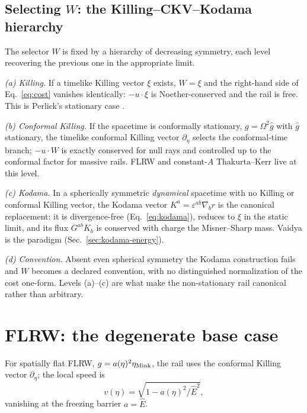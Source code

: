 \documentclass[12pt]{iopart}
\newcommand{\Ehat}{\hat E}
\begin{document}
\subsection{Selecting $W$: the Killing--CKV--Kodama hierarchy}
\label{sec:whierarchy}
The selector $W$ is fixed by a hierarchy of decreasing symmetry, each level
recovering the previous one in the appropriate limit.

\emph{(a) Killing.} If a timelike Killing vector $\xi$ exists, $W=\xi$ and the
right-hand side of Eq.~\eqref{eq:cost} vanishes identically: $-u\cdot\xi$ is
Noether-conserved and the rail is free. This is Perlick's stationary case
\cite{Perlick1991}.

\emph{(b) Conformal Killing.} If the spacetime is conformally stationary,
$g=\Omega^2\hat g$ with $\hat g$ stationary, the timelike conformal Killing
vector $\partial_\eta$ selects the conformal-time branch; $-u\cdot W$ is exactly
conserved for null rays and controlled up to the conformal factor for massive
rails. FLRW and constant-$A$ Thakurta--Kerr live at this level.

\emph{(c) Kodama.} In a spherically symmetric \emph{dynamical} spacetime with no
Killing or conformal Killing vector, the Kodama vector
$K^a=\varepsilon^{ab}\nabla_b r$ \cite{Kodama1980,Hayward1996} is the canonical
replacement: it is divergence-free (Eq.~\eqref{eq:kodama}), reduces to $\xi$ in
the static limit, and its flux $G^{ab}K_b$ is conserved with charge the
Misner--Sharp mass. Vaidya is the paradigm (Sec.~\ref{sec:kodama-energy}).

\emph{(d) Convention.} Absent even spherical symmetry the Kodama construction
fails and $W$ becomes a declared convention, with no distinguished normalization
of the cost one-form. Levels (a)--(c) are what make the non-stationary rail
canonical rather than arbitrary.


\section{FLRW: the degenerate base case}
\label{sec:flrw}
For spatially flat FLRW, $g=a(\eta)^2\eta_{\rm Mink}$, the rail uses the
conformal Killing vector $\partial_\eta$; the local speed is
\begin{equation}
    v(\eta)=\sqrt{1-a(\eta)^2/\Ehat^{2}},
    \label{eq:flrwspeed}
\end{equation}
vanishing at the freezing barrier $a=\Ehat$.
\end{document}
